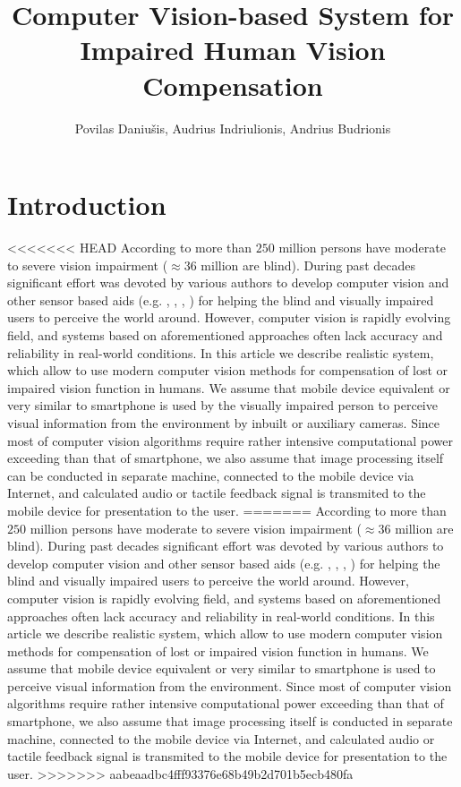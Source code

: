 \documentclass[a4paper,11pt]{article}
\author{Povilas Daniu\v{s}is, Audrius Indriulionis, Andrius Budrionis}
\title{Computer Vision-based System for Impaired Human Vision Compensation}
\begin{document}


\maketitle


\section{Introduction}

<<<<<<< HEAD
According to \cite{Bourne} more than $250$ million persons have moderate to severe vision impairment ($\approx 36$ million are blind). During past decades significant effort was devoted by various authors to develop computer vision and other sensor based aids (e.g. \cite{Caraiman}, \cite{Csapo}, \cite{Poggi}, \cite{Zientara}) for helping the blind and visually impaired users to perceive the world around. However, computer vision is rapidly evolving field, and systems based on aforementioned approaches often lack accuracy and reliability in real-world conditions. In this article we describe realistic system, which allow to use modern computer vision methods for compensation of lost or impaired vision function in humans. We assume that mobile device equivalent or very similar to smartphone is used by the visually impaired person to perceive visual information from the environment by inbuilt or auxiliary cameras. Since most of computer vision algorithms require rather intensive computational power exceeding than that of smartphone, we also assume that image processing itself can be conducted in separate machine, connected to the mobile device via Internet, and calculated audio or tactile feedback signal is transmited to the mobile device for presentation to the user. %
=======
According to \cite{Bourne} more than $250$ million persons have moderate to severe vision impairment ($\approx 36$ million are blind). During past decades significant effort was devoted by various authors to develop computer vision and other sensor based aids (e.g. \cite{Caraiman}, \cite{Csapo}, \cite{Poggi}, \cite{Zientara}) for helping the blind and visually impaired users to perceive the world around. However, computer vision is rapidly evolving field, and systems based on aforementioned approaches often lack accuracy and reliability in real-world conditions. In this article we describe realistic system, which allow to use modern computer vision methods for compensation of lost or impaired vision function in humans. We assume that mobile device equivalent or very similar to smartphone is used to perceive visual information from the environment. Since most of computer vision algorithms require rather intensive computational power exceeding than that of smartphone, we also assume that image processing itself is conducted in separate machine, connected to the mobile device via Internet, and calculated audio or tactile feedback signal is transmited to the mobile device for presentation to the user.
>>>>>>> aabeaadbc4fff93376e68b49b2d701b5ecb480fa
\end{document}
